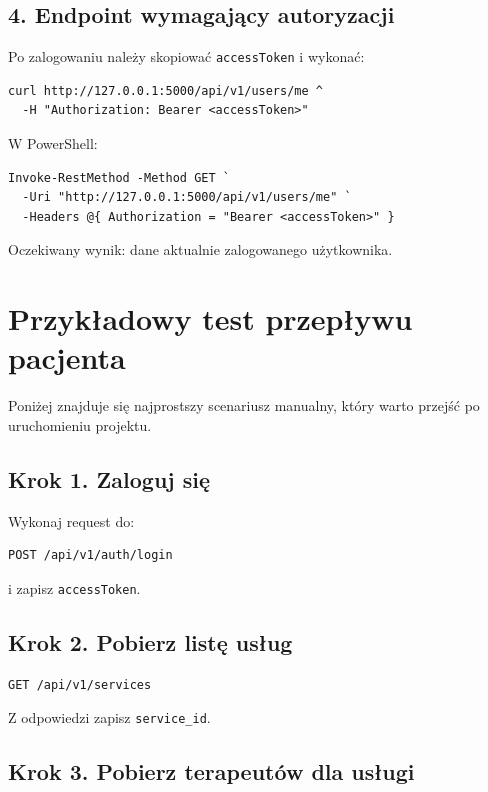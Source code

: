 \documentclass[11pt,a4paper]{article}
\begin{document}
\subsection{4. Endpoint wymagający autoryzacji}

Po zalogowaniu należy skopiować \texttt{accessToken} i wykonać:

\begin{lstlisting}
curl http://127.0.0.1:5000/api/v1/users/me ^
  -H "Authorization: Bearer <accessToken>"
\end{lstlisting}

W PowerShell:

\begin{lstlisting}
Invoke-RestMethod -Method GET `
  -Uri "http://127.0.0.1:5000/api/v1/users/me" `
  -Headers @{ Authorization = "Bearer <accessToken>" }
\end{lstlisting}

Oczekiwany wynik: dane aktualnie zalogowanego użytkownika.

\section{Przykładowy test przepływu pacjenta}

Poniżej znajduje się najprostszy scenariusz manualny, który warto przejść po uruchomieniu projektu.

\subsection{Krok 1. Zaloguj się}

Wykonaj request do:

\begin{lstlisting}
POST /api/v1/auth/login
\end{lstlisting}

i zapisz \texttt{accessToken}.

\subsection{Krok 2. Pobierz listę usług}

\begin{lstlisting}
GET /api/v1/services
\end{lstlisting}

Z odpowiedzi zapisz \texttt{service\_id}.

\subsection{Krok 3. Pobierz terapeutów dla usługi}
\end{document}
